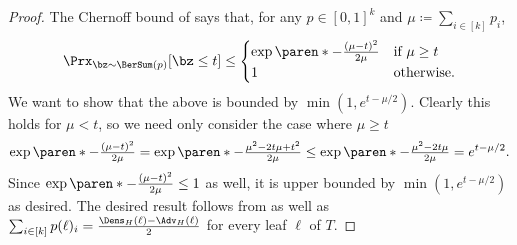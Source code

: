 \begin{proof}
    The Chernoff bound of  says that, for any $p \in [0,1]^k$ and $\mu \coloneqq \sum_{i \in [k]} p_i$,
    \begin{equation*}
        \Prx_{\bz \sim \BerSum(p)}[\bz \leq t] \leq \begin{cases}
            \exp\paren*{-\frac{(\mu - t)^2}{2\mu}}&\text{if }\mu \geq t \\
            1& \text{otherwise.}
        \end{cases}
    \end{equation*}
    We want to show that the above is bounded by $\min(1, e^{t- \mu/2})$. Clearly this holds for $\mu < t$, so we need only consider the case where $\mu \geq t$
    \begin{equation*}
         \exp\paren*{-\tfrac{(\mu - t)^2}{2\mu}} = \exp\paren*{-\tfrac{\mu^2 - 2t\mu + t^2}{2\mu}} \leq \exp\paren*{-\tfrac{\mu^2 - 2t\mu}{2\mu}} = e^{t - \mu/2}.
    \end{equation*}
    Since $ \exp\paren*{-\frac{(\mu - t)^2}{2\mu}} \leq 1$ as well, it is upper bounded by $\min(1, e^{t- \mu/2})$ as desired. The desired result follows from  as well as $\sum_{i \in [k]} p(\ell)_i = \frac{\Dens_H(\ell) - \Adv_H(\ell)}{2}$ for every leaf $\ell$ of $T$.
\end{proof}



